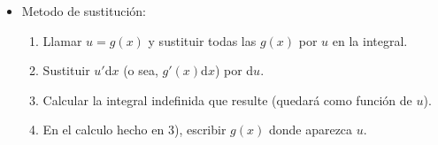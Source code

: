 \documentclass[a4paper,11pt]{report}
\begin{document}
\begin{itemize}
\begin{itemize}
{\large Parte V} \\[5pt]
{\huge Primitivas} \\
Definición: Si existe una función $\mathcal{F}$ tal que  $\mathcal{F'}(x) =f(x)$ para todo $x$ en el dominio de $f$, entonces  $\mathcal{F}$ se llama primitiva de $f$.\\
\begin{center}
\begin{tabular}{|c|c|}
\hline
$f$ & $\mathcal{F}$ \\
\hline
$f(x)$ & $\int f(x)dx$ \\ \hline
$x^a (a\neq -1)$ & $\dfrac{x^{a+1}}{a+1} + C$  \\ \hline
$e^x$ & $e^x + C$ \\ \hline
$\sin(x)$ & $-\cos(x) + C$ \\ \hline
$\cos(x)$ & $\sin(x) + C$ \\ \hline
$\dfrac{1}{\cos^2 x}$ & $\tan x + C$ \\ \hline
$\dfrac{1}{x}$ & $\ln|x|+C$ \\ \hline
$\dfrac{1}{\sqrt{1-x^2}}$ & $\arcsin(x)+C$\\ \hline
$\dfrac{1}{1+x^2}$ & $\arctan(x)+C$ \\ \hline
$\cosh(x)$ & $\sinh(x)+C$ \\ \hline
$\sinh(x)$ & $\cosh(x)+C$ \\ \hline
$\dfrac{1}{\sqrt{1+x^2}}$ & $\arg \cosh x + C$ \\ \hline
$\dfrac{1}{1-x^2}$ & $\arg \tanh x + C$ \\ \hline
$\dfrac{1}{\sin^2 x}$ & $-\cot x + C$ \\[5pt] \hline
\end{tabular}
\end{center}
\item Metodo de sustitución: \\
\begin{enumerate}
\item Llamar $u=g(x)$ y sustituir todas las $g(x)$ por $u$ en la integral.\\
\item Sustituir $u'$d$x$ (o sea, $g'(x)$d$x$) por d$u$.\\
\item Calcular la integral indefinida que resulte (quedará como función de $u$).\\
\item En el calculo hecho en 3), escribir $g(x)$ donde aparezca $u$.\\
\end{enumerate}

\end{itemize}
\end{itemize}
\end{document}
